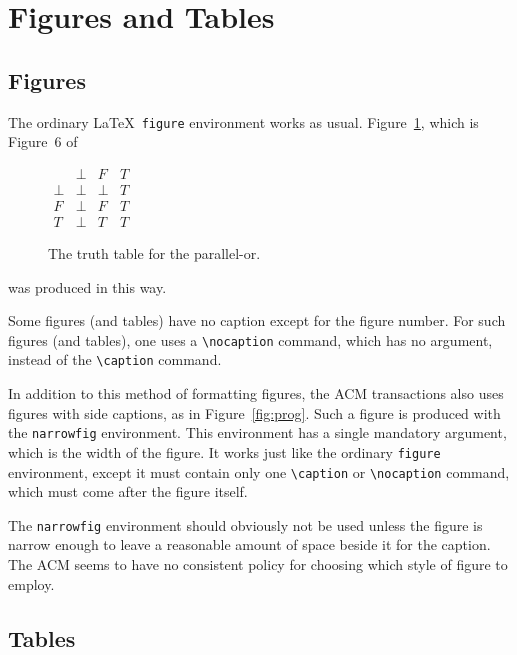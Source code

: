 \section{Figures and Tables}

\subsection{Figures}

The ordinary \LaTeX\ {\tt figure} environment works as usual.
Figure~\ref{fig:ordinary}, which is Figure~6 of \cite{7(2):311}
\begin{figure}
\centering
\(\begin{array}{c|ccc}
     & \bot & F & T \\
\hline
\bot & \bot & \bot & T \\
F    & \bot & F    & T \\
T    & \bot & T    & T
\end{array}\)
\caption{The truth table for the parallel-or.}
\label{fig:ordinary}
\end{figure}
was produced in this way.  

Some figures (and tables) have no caption except for the figure number.
For such figures (and tables), one uses a \verb|\nocaption| command,
which has no argument, instead of the \verb|\caption| command.

In addition to this method of formatting figures, the ACM transactions
also uses figures with side captions, as in Figure~\ref{fig:prog}.
Such a figure is produced with the {\tt narrowfig} environment.  This
environment has a single mandatory argument, which is the width of the
figure.  It works just like the ordinary {\tt figure} environment,
except it must contain only one \verb|\caption| or \verb|\nocaption|
command, which must come after the figure itself.  

The {\tt narrowfig} environment should obviously not be used unless the
figure is narrow enough to leave a reasonable amount of space beside it
for the caption.  The ACM seems to have no consistent policy for choosing
which style of figure to employ.

\subsection{Tables}

